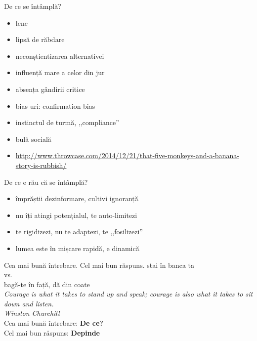 \documentclass{beamer}
\begin{document}
\begin{frame}{De ce se întâmplă?}
  \begin{itemize}
    \pause \item lene
    \pause \item lipsă de răbdare
    \pause \item neconștientizarea alternativei
    \pause \item influență mare a celor din jur
    \pause \item absența gândirii critice
    \pause \item bias-uri: confirmation bias
    \pause \item instinctul de turmă, ,,compliance''
    \pause \item bulă socială
    \pause \item \url{http://www.throwcase.com/2014/12/21/that-five-monkeys-and-a-banana-story-is-rubbish/}
  \end{itemize}
\end{frame}

\begin{frame}{De ce e rău că se întâmplă?}
  \begin{itemize}
    \pause \item împrăștii dezinformare, cultivi ignoranță
    \pause \item nu îți atingi potențialul, te auto-limitezi
    \pause \item te rigidizezi, nu te adaptezi, te ,,fosilizezi''
    \pause \item lumea este în mișcare rapidă, e dinamică
  \end{itemize}
\end{frame}

\begin{frame}{Cea mai bună întrebare. Cel mai bun răspuns.}
  \centering
  \pause stai în banca ta \\
    \pause vs. \\
  \pause bagă-te în față, dă din coate\\
  \pause
  \vspace{5mm}
  \textit{Courage is what it takes to stand up and speak; courage is also what it takes to sit down and listen.}\\
  \vspace{3mm}
  \hfill \textit{Winston Churchill}\\
  \vspace{5mm}
  \pause Cea mai bună întrebare: \textbf{De ce?} \\
  \pause Cel mai bun răspuns: \textbf{Depinde}
\end{frame}
\end{document}
